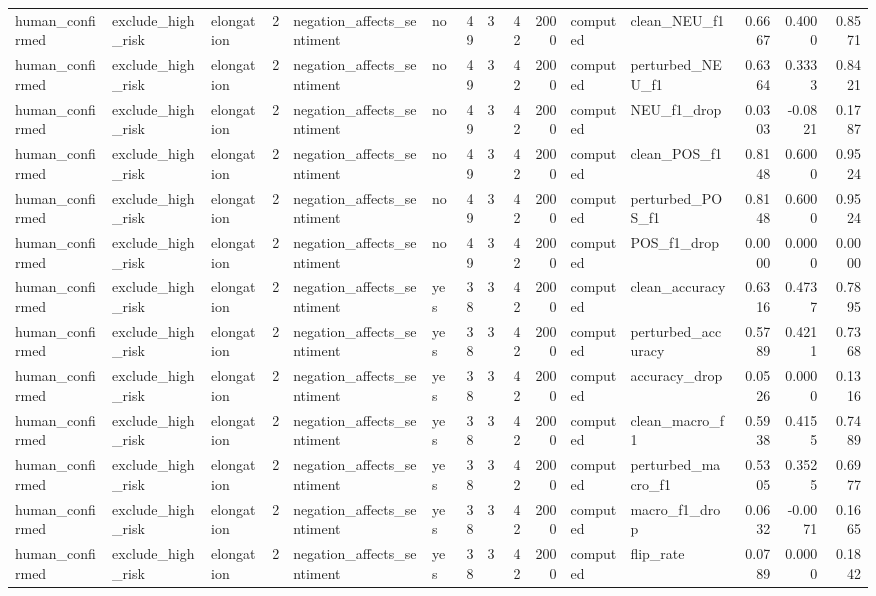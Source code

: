\begin{tabular}{lllrllrrrrllrrr}
human_confirmed & exclude_high_risk & elongation & 2 & negation_affects_sentiment & no & 49 & 3 & 42 & 2000 & computed & clean_NEU_f1 & 0.6667 & 0.4000 & 0.8571 \\
human_confirmed & exclude_high_risk & elongation & 2 & negation_affects_sentiment & no & 49 & 3 & 42 & 2000 & computed & perturbed_NEU_f1 & 0.6364 & 0.3333 & 0.8421 \\
human_confirmed & exclude_high_risk & elongation & 2 & negation_affects_sentiment & no & 49 & 3 & 42 & 2000 & computed & NEU_f1_drop & 0.0303 & -0.0821 & 0.1787 \\
human_confirmed & exclude_high_risk & elongation & 2 & negation_affects_sentiment & no & 49 & 3 & 42 & 2000 & computed & clean_POS_f1 & 0.8148 & 0.6000 & 0.9524 \\
human_confirmed & exclude_high_risk & elongation & 2 & negation_affects_sentiment & no & 49 & 3 & 42 & 2000 & computed & perturbed_POS_f1 & 0.8148 & 0.6000 & 0.9524 \\
human_confirmed & exclude_high_risk & elongation & 2 & negation_affects_sentiment & no & 49 & 3 & 42 & 2000 & computed & POS_f1_drop & 0.0000 & 0.0000 & 0.0000 \\
human_confirmed & exclude_high_risk & elongation & 2 & negation_affects_sentiment & yes & 38 & 3 & 42 & 2000 & computed & clean_accuracy & 0.6316 & 0.4737 & 0.7895 \\
human_confirmed & exclude_high_risk & elongation & 2 & negation_affects_sentiment & yes & 38 & 3 & 42 & 2000 & computed & perturbed_accuracy & 0.5789 & 0.4211 & 0.7368 \\
human_confirmed & exclude_high_risk & elongation & 2 & negation_affects_sentiment & yes & 38 & 3 & 42 & 2000 & computed & accuracy_drop & 0.0526 & 0.0000 & 0.1316 \\
human_confirmed & exclude_high_risk & elongation & 2 & negation_affects_sentiment & yes & 38 & 3 & 42 & 2000 & computed & clean_macro_f1 & 0.5938 & 0.4155 & 0.7489 \\
human_confirmed & exclude_high_risk & elongation & 2 & negation_affects_sentiment & yes & 38 & 3 & 42 & 2000 & computed & perturbed_macro_f1 & 0.5305 & 0.3525 & 0.6977 \\
human_confirmed & exclude_high_risk & elongation & 2 & negation_affects_sentiment & yes & 38 & 3 & 42 & 2000 & computed & macro_f1_drop & 0.0632 & -0.0071 & 0.1665 \\
human_confirmed & exclude_high_risk & elongation & 2 & negation_affects_sentiment & yes & 38 & 3 & 42 & 2000 & computed & flip_rate & 0.0789 & 0.0000 & 0.1842 \\

\end{tabular}
